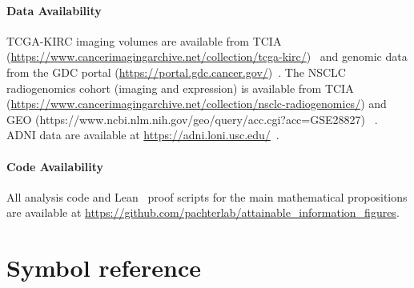 \documentclass{article}
\begin{document}
\paragraph{Data Availability}
TCGA-KIRC imaging volumes are available from TCIA (\url{https://www.cancerimagingarchive.net/collection/tcga-kirc/})~\citep{clark2013tcia,tcgakirc_tcia} and genomic data from the GDC portal (\url{https://portal.gdc.cancer.gov/})~\citep{ricketts2018tcgakirc}.
The NSCLC radiogenomics cohort (imaging and expression) is available from TCIA (\url{https://www.cancerimagingarchive.net/collection/nsclc-radiogenomics/}) and GEO (https://www.ncbi.nlm.nih.gov/geo/query/acc.cgi?acc=GSE28827) ~\citep{bakr2018nsclcradiogenomics}.
ADNI data are available at \url{https://adni.loni.usc.edu/}~\citep{petersen2010adni}.

\paragraph{Code Availability}
All analysis code and Lean~\citep{moura2021lean4} proof scripts for the main mathematical propositions are available at \url{https://github.com/pachterlab/attainable_information_figures}.

\appendix
\section{Symbol reference}
\label{app:symbols}
\end{document}
